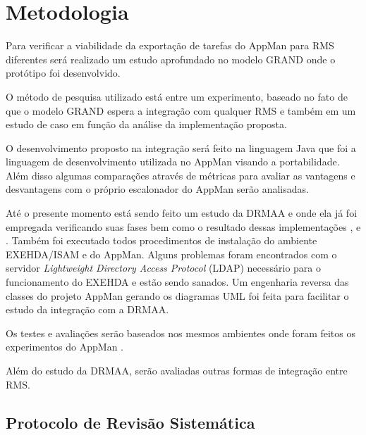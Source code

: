 \section{Metodologia}
\label{cap:metodologia}

Para verificar a viabilidade da exportação de tarefas do AppMan para RMS diferentes será realizado um estudo aprofundado no modelo GRAND onde o protótipo foi desenvolvido.

O método de pesquisa utilizado está entre um experimento, baseado no fato de que o modelo GRAND espera a integração com qualquer RMS e também em um estudo de caso em função da análise da implementação proposta.

O desenvolvimento proposto na integração será feito na linguagem Java que foi a linguagem de desenvolvimento utilizada no AppMan visando a portabilidade. Além disso algumas comparações através de métricas para avaliar as vantagens e desvantagens com o próprio escalonador do AppMan serão analisadas.

Até o presente momento está sendo feito um estudo da DRMAA e onde ela já foi empregada verificando suas fases bem como o resultado dessas implementações \cite{Templeton}, \cite{Llorente2005} e \cite{Haas2004}. Também foi executado todos procedimentos de instalação do ambiente EXEHDA/ISAM e do AppMan. Alguns problemas foram encontrados com o servidor \emph{ Lightweight Directory Access Protocol} (LDAP) necessário para o funcionamento do EXEHDA e estão sendo sanados. Um engenharia reversa das classes do projeto AppMan gerando os diagramas UML foi feita para facilitar o estudo da integração com a DRMAA.

Os testes e avaliações serão baseados nos mesmos ambientes onde foram feitos os experimentos do AppMan \cite{Mangan2006}. 

Além do estudo da DRMAA, serão avaliadas outras formas de integração entre RMS.

\subsection{Protocolo de Revisão Sistemática}
